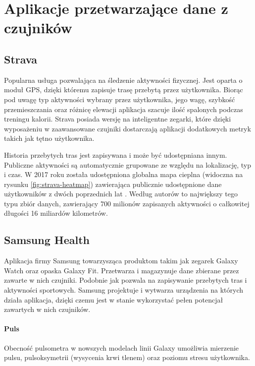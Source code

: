 \section{Aplikacje przetwarzające dane z czujników}

\subsection{Strava}
\label{sec:strava}
Popularna usługa pozwalająca na śledzenie aktywności fizycznej. Jest oparta o moduł GPS, dzięki któremu zapisuje trasę przebytą przez użytkownika. Biorąc pod uwagę typ aktywności wybrany przez użytkownika, jego wagę, szybkość przemieszczania oraz różnicę elewacji aplikacja szacuje ilość spalonych podczas treningu kalorii. Strava posiada wersję na inteligentne zegarki, które dzięki wyposażeniu w zaawansowane czujniki dostarczają aplikacji dodatkowych metryk takich jak tętno użytkownika. 

Historia przebytych tras jest zapisywana i może być udostępniana innym. Publiczne aktywności są automatycznie grupowane ze względu na lokalizację, typ i czas. W 2017 roku została udostępniona globalna mapa cieplna (widoczna na rysunku \ref{fig:strava-heatmap}) zawierająca publicznie udostępnione dane użytkowników z dwóch poprzednich lat \cite{Strava_Heatmap}. Według autorów to największy tego typu zbiór danych, zawierający 700 milionów zapisanych aktywności o całkowitej długości 16 miliardów kilometrów.


\subsection{Samsung Health}
Aplikacja firmy Samsung towarzysząca produktom takim jak zegarek Galaxy Watch oraz opaska Galaxy Fit. Przetwarza i magazynuje dane zbierane przez zawarte w nich czujniki. Podobnie jak  pozwala na zapisywanie przebytych tras i aktywności sportowych. Samsung projektuje i wytwarza urządzenia na których działa aplikacja, dzięki czemu jest w stanie wykorzystać pełen potencjał zawartych w nich czujników.

\paragraph{Puls} Obecność pulsometra w nowszych modelach linii Galaxy umożliwia mierzenie pulsu, pulsoksymetrii (wysycenia krwi tlenem) oraz poziomu stresu użytkownika. 

